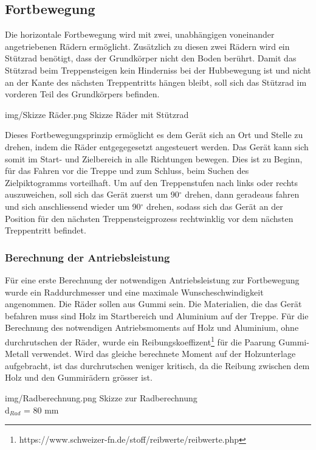 \newpage
\subsection{Fortbewegung}
Die horizontale Fortbewegung wird mit zwei, unabhängigen voneinander angetriebenen Rädern ermöglicht. Zusätzlich zu diesen zwei Rädern wird ein Stützrad benötigt, dass der Grundkörper nicht den Boden berührt. Damit das Stützrad beim Treppensteigen kein Hinderniss bei der Hubbewegung ist und nicht an der Kante des nächsten Treppentritts hängen bleibt, soll sich das Stützrad im vorderen Teil des Grundkörpers befinden. 

\image
 {img/Skizze Räder.png}
 {Skizze Räder mit Stützrad}

Dieses Fortbewegungsprinzip ermöglicht es dem Gerät sich an Ort und Stelle zu drehen, indem die Räder entgegegesetzt angesteuert werden. Das Gerät kann sich somit im Start- und Zielbereich in alle Richtungen bewegen. Dies ist zu Beginn, für das Fahren vor die Treppe und zum Schluss, beim Suchen des Zielpiktogramms vorteilhaft. Um auf den Treppenstufen nach links oder rechts auszuweichen, soll sich das Gerät zuerst um 90$^\circ$ drehen, dann geradeaus fahren und sich anschliessend wieder um 90$^\circ$ drehen, sodass sich das Gerät an der Position für den nächsten Treppensteigprozess rechtwinklig vor dem nächsten Treppentritt befindet.

\subsubsection{Berechnung der Antriebsleistung}

Für eine erste Berechnung der notwendigen Antriebsleistung zur Fortbewegung wurde ein Raddurchmesser und eine maximale Wunscheschwindigkeit angenommen. Die Räder sollen aus Gummi sein. Die Materialien, die das Gerät befahren muss sind Holz im Startbereich und Aluminium auf der Treppe. Für die Berechnung des notwendigen Antriebsmoments auf Holz und Aluminium, ohne durchrutschen der Räder, wurde ein Reibungskoeffizent\footnote{https://www.schweizer-fn.de/stoff/reibwerte/reibwerte.php} für die Paarung Gummi-Metall verwendet. Wird das gleiche berechnete Moment auf der Holzunterlage aufgebracht, ist das durchrutschen weniger kritisch, da die Reibung zwischen dem Holz und den Gummirädern grösser ist.

\image
 {img/Radberechnung.png}
 {Skizze zur Radberechnung}\\

\newpage
d$_{Rad}$ = 80 mm

